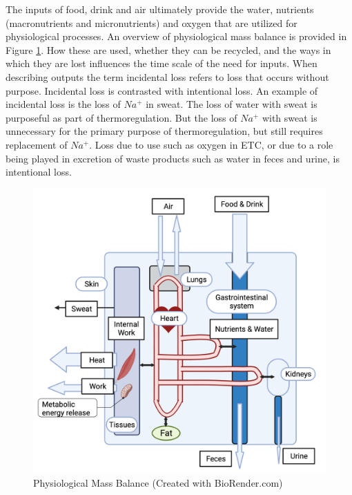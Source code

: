 The inputs of food, drink and air ultimately provide the water, nutrients (macronutrients and micronutrients) and oxygen that are utilized for physiological processes. An overview of physiological mass balance is provided in Figure \ref{fig:mass_balance}. How these are used, whether they can be recycled, and the ways in which they are lost influences the time scale of the need for inputs. When describing outputs the term incidental loss refers to loss that occurs without purpose. Incidental loss is contrasted with intentional loss. An example of incidental loss is the loss of $Na^+$ in sweat. The loss of water with sweat is purposeful as part of thermoregulation. But the loss of $Na^+$ with sweat is unnecessary for the primary purpose of thermoregulation, but still requires replacement of $Na^+$. Loss due to use such as oxygen in ETC, or due to a role being played in excretion of waste products such as water in feces and urine, is intentional loss. 

\begin{figure}[!h]
    \centering
    \includegraphics[width=1\linewidth]{./figure/mass_balance.png}
    \caption{Physiological Mass Balance \footnotesize{(Created with BioRender.com)}}
    \label{fig:mass_balance}
\end{figure}


